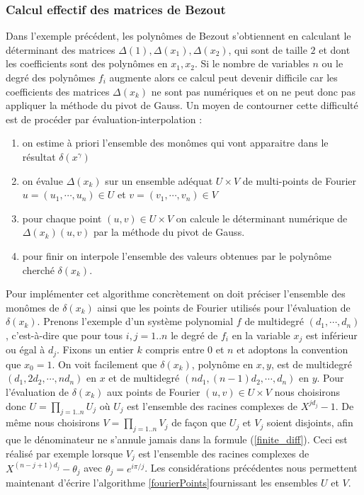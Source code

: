\documentclass{standalone}
\begin{document}
\subsubsection{Calcul effectif des matrices de Bezout}
Dans l'exemple précédent, les polynômes de Bezout s'obtiennent en calculant le déterminant des matrices $\Delta(1), \Delta(x_1), \Delta(x_2)$, qui sont de taille $2$ et dont les coefficients sont des polynômes en $x_1, x_2$. Si le nombre de variables $n$ ou le degré des polynômes $f_i$ augmente alors ce calcul peut devenir difficile car les coefficients des matrices $\Delta(x_k)$ ne sont pas numériques et on ne peut donc pas appliquer la méthode du pivot de Gauss. Un moyen de contourner cette difficulté est de procéder par évaluation-interpolation :
\begin{enumerate}
\item
on estime à priori l'ensemble des monômes qui vont apparaitre dans le résultat $\delta(x^\gamma)$
\item
on évalue $\Delta(x_k)$ sur un ensemble adéquat $U \times V$ de multi-points de Fourier $u = (u_1,\cdots, u_n) \in U$ et $v = (v_1,\cdots, v_n) \in V$
\item
pour chaque point $(u, v) \in U\times V$ on calcule le déterminant numérique de $\Delta(x_k)(u, v)$ par la méthode du pivot de Gauss.
\item
pour finir on interpole l'ensemble des valeurs obtenues par le polynôme cherché $\delta(x_k)$.
\end{enumerate}
Pour implémenter cet algorithme concrètement on doit préciser l'ensemble des monômes de $\delta(x_k)$ ainsi que les points de Fourier utilisés pour l'évaluation de $\delta(x_k)$. Prenons l'exemple d'un système polynomial $f$ de multidegré $(d_1, \cdots, d_n)$, c'est-à-dire que pour tous $i, j = 1..n$ le degré de $f_i$ en la variable $x_j$ est inférieur ou égal à $d_j$. Fixons un entier $k$ compris entre $0$ et $n$ et adoptons la convention que $x_0 = 1$. On voit facilement que $\delta(x_k)$, polynôme en $x, y$, est de multidegré $(d_1, 2d_2, \cdots, nd_n)$ en $x$ et de multidegré $(nd_1, (n-1)d_2, \cdots, d_n)$ en $y$.
 Pour l'évaluation de $\delta(x_k)$ aux points de Fourier $(u, v) \in U\times V$ nous choisirons donc $U = \prod_{j=1..n} U_j$ o\`u $U_j$ est l'ensemble des racines complexes de $X^{jd_j} - 1$. De même nous choisirons $V = \prod_{j=1..n} V_j$ de façon que $U_j$ et $V_j$ soient disjoints, afin que le dénominateur ne s'annule jamais dans la formule (\ref{finite_diff}). Ceci est réalisé par exemple lorsque $V_j$ est l'ensemble des racines complexes de $X^{(n-j+1)d_j} - \theta_j$ avec $\theta_j = e^{i\pi/j}$. Les considérations précédentes nous permettent maintenant d'écrire l'algorithme \ref{fourierPoints}fournissant les ensembles $U$ et $V$.
\end{document}
